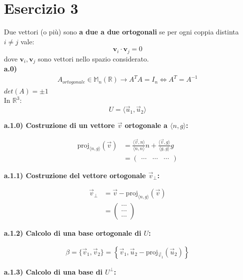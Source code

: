 \documentclass[a4paper,12pt]{article}
\begin{document}
\pagebreak
\section*{Esercizio 3}
Due vettori (o più) sono \textbf{a due a due ortogonali} se per ogni coppia distinta \(i \neq j\) vale:
\[
\mathbf{v}_i \cdot \mathbf{v}_j = 0
\]
dove \(\mathbf{v}_i, \mathbf{v}_j\) sono vettori nello spazio considerato. \\
\textbf{a.0)}
\begin{align*}
    A_{ortogonale}\in \mathbb{M}_n(\mathbb{R}) \to A^T A = I_n \iff A^T=A^{-1}
\end{align*}
$det(A)=\pm 1$ \\
In $\mathbb{R}^3$:
\[
U = \langle \vec{u}_1, \vec{u}_2 \rangle
\]

\textbf{a.1.0) Costruzione di un vettore $\vec{v}$ ortogonale a $\langle n, g \rangle$:}

\begin{align*}
\mathrm{proj}_{\langle n,g \rangle}(\vec{v}) 
&= \frac{\langle \vec{v},n \rangle}{\langle n,n \rangle}n 
+ \frac{\langle \vec{v},g \rangle}{\langle g,g \rangle}g \\
&= \begin{pmatrix}
\dots & \dots & \dots
\end{pmatrix}
\end{align*}

\textbf{a.1.1) Costruzione del vettore ortogonale $\vec{v}_\perp$:}

\begin{align*}
\vec{v}_\perp 
&= \vec{v} - \mathrm{proj}_{\langle n, g \rangle}(\vec{v}) \\
&= \begin{pmatrix}
\cdots \\ \cdots \\ \cdots
\end{pmatrix}
\end{align*}

\textbf{a.1.2) Calcolo di una base ortogonale di $U$:}

\begin{align*}
\beta = \{\vec{v}_1, \vec{v}_2\} = \left\{\vec{v}_1, \vec{u}_2 - \mathrm{proj}_{\vec{v}_1}(\vec{u}_2) \right\}
\end{align*}

\textbf{a.1.3) Calcolo di una base di $U^\perp$:}
\end{document}
